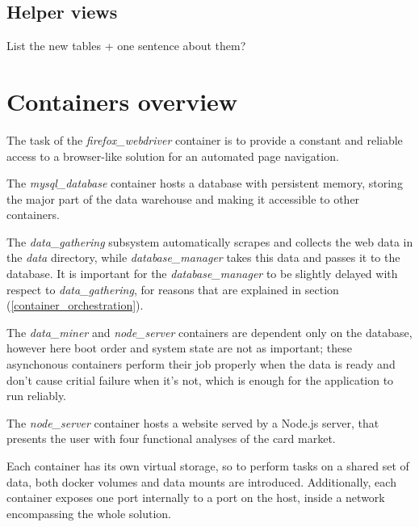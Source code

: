 \subsection{Helper views}
List the new tables + one sentence about them?

\section{Containers overview}
The task of the \textit{firefox\_webdriver} container is to provide a constant and reliable access to a browser-like solution for an automated page navigation.

The \textit{mysql\_database} container hosts a database with persistent memory, storing the major part of the data warehouse and making it accessible to other containers.

The \textit{data\_gathering} subsystem automatically scrapes and collects the web data in the \textit{data} directory, while \textit{database\_manager} takes this data and passes it to the database. It is important for the \textit{database\_manager} to be slightly delayed with respect to \textit{data\_gathering}, for reasons that are explained in section (\ref{container_orchestration}).

The \textit{data\_miner} and \textit{node\_server} containers are dependent only on the database, however here boot order and system state are not as important; these asynchonous containers perform their job properly when the data is ready and don't cause critial failure when it's not, which is enough for the application to run reliably.

The \textit{node\_server} container hosts a website served by a Node.js server, that presents the user with four functional analyses of the card market.

Each container has its own virtual storage, so to perform tasks on a shared set of data, both docker volumes and data mounts are introduced. Additionally, each container exposes one port internally to a port on the host, inside a network encompassing the whole solution.
